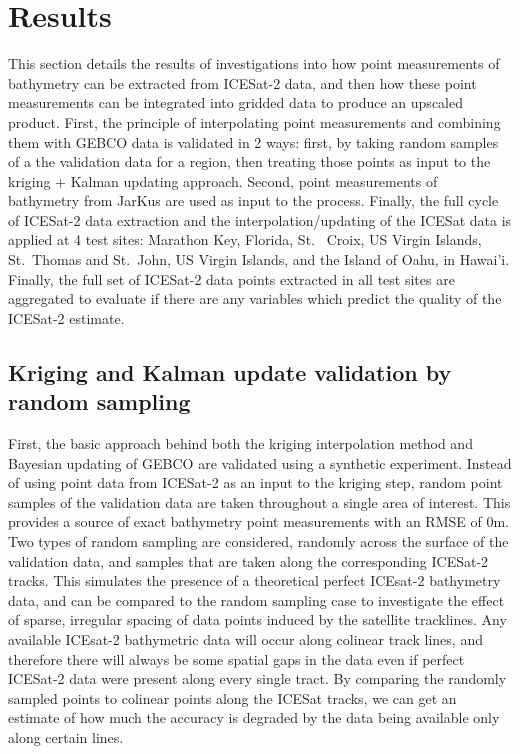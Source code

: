 
\chapter{Results}

This section details the results of investigations into how point measurements of bathymetry can be extracted from ICESat-2 data, and then how these point measurements can be integrated into gridded data to produce an upscaled product. First, the principle of interpolating point measurements and combining them with GEBCO data is validated in 2 ways: first, by taking random samples of a the validation data for a region, then treating those points as input to the kriging + Kalman updating approach. Second, point measurements of bathymetry from JarKus are used as input to the process. Finally, the full cycle of ICESat-2 data extraction and the interpolation/updating of the ICESat data is applied at 4 test sites: Marathon Key, Florida, St.~ Croix, US Virgin Islands, St.~Thomas and St.~John, US Virgin Islands, and the Island of Oahu, in Hawai'i. Finally, the full set of ICESat-2 data points extracted in all test sites are aggregated to evaluate if there are any variables which predict the quality of the ICESat-2 estimate.

\section{Kriging and Kalman update validation by random sampling}

First, the basic approach behind both the kriging interpolation method and Bayesian updating of GEBCO are validated using a synthetic experiment. Instead of using point data from ICESat-2 as an input to the kriging step, random point samples of the validation data are taken throughout a single area of interest. This provides a source of exact bathymetry point measurements with an RMSE of 0m. Two types of random sampling are considered, randomly across the surface of the validation data, and samples that are taken along the corresponding ICESat-2 tracks. This simulates the presence of a theoretical perfect ICEsat-2 bathymetry data, and can be compared to the random sampling case to investigate the effect of sparse, irregular spacing of data points induced by the satellite tracklines. Any available ICEsat-2 bathymetric data will occur along colinear track lines, and therefore there will always be some spatial gaps in the data even if perfect ICESat-2 data were present along every single tract. By comparing the randomly sampled points to colinear points along the ICESat tracks, we can get an estimate of how much the accuracy is degraded by the data being available only along certain lines. 

